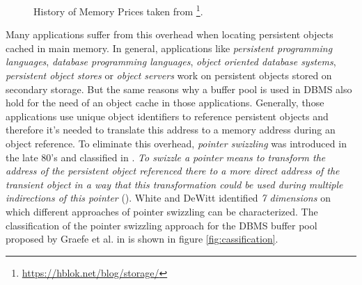 \begin{@empty}

	
	\begin{figure}[ht!]
		\centering
		\caption[History of Memory Prices]{History of Memory Prices taken from \footnote{\url{https://hblok.net/blog/storage/}}.}
		\label{fig:memorycost}
	\end{figure}
\end{@empty}

	Many applications suffer from this overhead when locating persistent objects cached in main memory. In general, applications like \textit{persistent programming languages}, \textit{database programming languages}, \textit{object oriented database systems}, \textit{persistent object stores} or \textit{object servers} work on persistent objects stored on secondary storage. But the same reasons why a buffer pool is used in DBMS also hold for the need of an object cache in those applications. Generally, those applications use unique object identifiers to reference persistent objects and therefore it's needed to translate this address to a memory address during an object reference. To eliminate this overhead, \emph{pointer swizzling} was introduced in the late 80's and classified in \cite{White:1995}. \emph{To swizzle a pointer means to transform the address of the persistent object referenced there to a more direct address of the transient object in a way that this transformation could be used during multiple indirections of this pointer} (\cite{Moss:1992}). White and DeWitt identified \emph{7 dimensions} on which different approaches of pointer swizzling can be characterized. The classification of the pointer swizzling approach for the DBMS buffer pool proposed by Graefe et al. in \cite{Graefe:2014} is shown in figure \ref{fig:cassification}.
	
